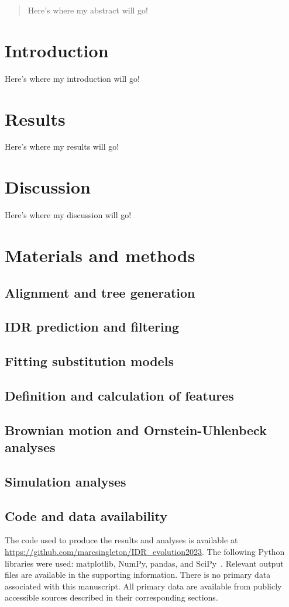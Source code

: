 \begin{abstract}
\noindent
Here's where my abstract will go!
\end{abstract}

\section{Introduction}
Here's where my introduction will go!

\section{Results}
Here's where my results will go!

\section{Discussion}
Here's where my discussion will go!

\section{Materials and methods}

\subsection{Alignment and tree generation}

\subsection{IDR prediction and filtering}

\subsection{Fitting substitution models}

\subsection{Definition and calculation of features}

\subsection{Brownian motion and Ornstein-Uhlenbeck analyses}

\subsection{Simulation analyses}

\subsection{Code and data availability}
The code used to produce the results and analyses is available at \url{https://github.com/marcsingleton/IDR_evolution2023}. The following Python libraries were used: matplotlib, NumPy, pandas, and SciPy~\cite{Hunter2007, Harris2020, McKinney2010, Virtanen2020}. Relevant output files are available in the supporting information. There is no primary data associated with this manuscript. All primary data are available from publicly accessible sources described in their corresponding sections.